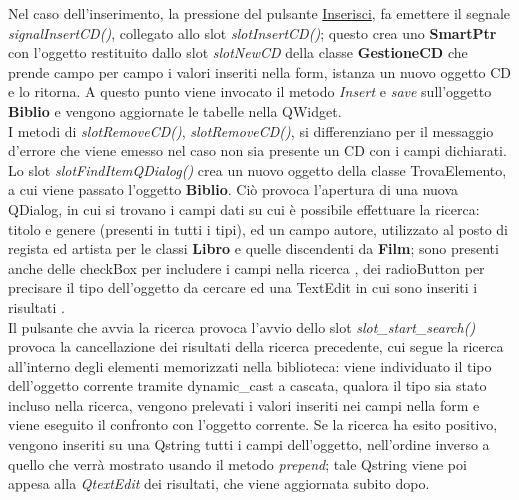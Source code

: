 {{	Nel caso dell'inserimento, la pressione del pulsante \underline{Inserisci}, fa emettere il segnale \textit{signalInsertCD()}, collegato allo slot \textit{slotInsertCD()}; questo crea uno \textbf{SmartPtr} con l'oggetto restituito dallo slot \textit{slotNewCD} della classe \textbf{GestioneCD} che prende campo per campo i valori inseriti nella form, istanza un nuovo oggetto CD e lo ritorna. A questo punto viene invocato il metodo \textit{Insert} e \textit{save} sull'oggetto \textbf{Biblio} e vengono aggiornate le tabelle nella QWidget. \\
	I metodi di \textit{slotRemoveCD()}, \textit{slotRemoveCD()}, si differenziano per il messaggio d'errore che viene emesso nel caso non sia presente un CD con i campi dichiarati.\\
	Lo slot \textit{slotFindItemQDialog()} crea un nuovo oggetto della classe TrovaElemento, a cui viene passato l'oggetto \textbf{Biblio}. Ciò provoca l'apertura di una nuova QDialog, in cui si trovano i campi dati su cui è possibile effettuare la ricerca: titolo e genere (presenti in tutti i tipi), ed un campo autore, utilizzato al posto di regista ed artista per le classi \textbf{Libro} e quelle discendenti da \textbf{Film}; sono presenti anche delle checkBox per includere i campi nella ricerca , dei radioButton per precisare il tipo dell'oggetto da cercare ed una TextEdit in cui sono inseriti i risultati .\\
	Il pulsante che avvia la ricerca provoca l'avvio dello slot \textit{slot\_start\_search()} provoca la cancellazione dei risultati della ricerca precedente, cui segue la ricerca all'interno degli elementi memorizzati nella biblioteca: viene individuato il tipo dell'oggetto corrente tramite  dynamic\_cast a cascata, qualora il tipo sia stato incluso nella ricerca, vengono prelevati i valori inseriti nei campi nella form e viene eseguito il confronto con l'oggetto corrente. Se la ricerca ha esito positivo, vengono inseriti su una Qstring tutti i campi dell'oggetto, nell'ordine inverso a quello che verrà mostrato usando il metodo \textit{prepend}; tale Qstring viene poi appesa alla \textit{QtextEdit} dei risultati, che viene aggiornata subito dopo.\\
	}
}